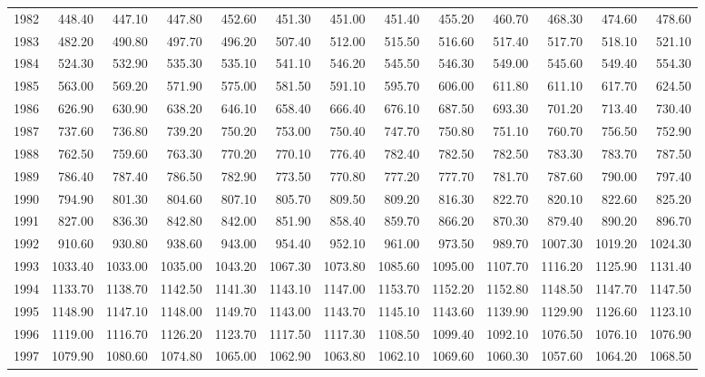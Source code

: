 \begin{longtable}{rrrrrrrrrrrrr}
  1982 & 448.40 & 447.10 & 447.80 & 452.60 & 451.30 & 451.00 & 451.40 & 455.20 & 460.70 & 468.30 & 474.60 & 478.60 \\ 
  1983 & 482.20 & 490.80 & 497.70 & 496.20 & 507.40 & 512.00 & 515.50 & 516.60 & 517.40 & 517.70 & 518.10 & 521.10 \\ 
  1984 & 524.30 & 532.90 & 535.30 & 535.10 & 541.10 & 546.20 & 545.50 & 546.30 & 549.00 & 545.60 & 549.40 & 554.30 \\ 
  1985 & 563.00 & 569.20 & 571.90 & 575.00 & 581.50 & 591.10 & 595.70 & 606.00 & 611.80 & 611.10 & 617.70 & 624.50 \\ 
  1986 & 626.90 & 630.90 & 638.20 & 646.10 & 658.40 & 666.40 & 676.10 & 687.50 & 693.30 & 701.20 & 713.40 & 730.40 \\ 
  1987 & 737.60 & 736.80 & 739.20 & 750.20 & 753.00 & 750.40 & 747.70 & 750.80 & 751.10 & 760.70 & 756.50 & 752.90 \\ 
  1988 & 762.50 & 759.60 & 763.30 & 770.20 & 770.10 & 776.40 & 782.40 & 782.50 & 782.50 & 783.30 & 783.70 & 787.50 \\ 
  1989 & 786.40 & 787.40 & 786.50 & 782.90 & 773.50 & 770.80 & 777.20 & 777.70 & 781.70 & 787.60 & 790.00 & 797.40 \\ 
  1990 & 794.90 & 801.30 & 804.60 & 807.10 & 805.70 & 809.50 & 809.20 & 816.30 & 822.70 & 820.10 & 822.60 & 825.20 \\ 
  1991 & 827.00 & 836.30 & 842.80 & 842.00 & 851.90 & 858.40 & 859.70 & 866.20 & 870.30 & 879.40 & 890.20 & 896.70 \\ 
  1992 & 910.60 & 930.80 & 938.60 & 943.00 & 954.40 & 952.10 & 961.00 & 973.50 & 989.70 & 1007.30 & 1019.20 & 1024.30 \\ 
  1993 & 1033.40 & 1033.00 & 1035.00 & 1043.20 & 1067.30 & 1073.80 & 1085.60 & 1095.00 & 1107.70 & 1116.20 & 1125.90 & 1131.40 \\ 
  1994 & 1133.70 & 1138.70 & 1142.50 & 1141.30 & 1143.10 & 1147.00 & 1153.70 & 1152.20 & 1152.80 & 1148.50 & 1147.70 & 1147.50 \\ 
  1995 & 1148.90 & 1147.10 & 1148.00 & 1149.70 & 1143.00 & 1143.70 & 1145.10 & 1143.60 & 1139.90 & 1129.90 & 1126.60 & 1123.10 \\ 
  1996 & 1119.00 & 1116.70 & 1126.20 & 1123.70 & 1117.50 & 1117.30 & 1108.50 & 1099.40 & 1092.10 & 1076.50 & 1076.10 & 1076.90 \\ 
  1997 & 1079.90 & 1080.60 & 1074.80 & 1065.00 & 1062.90 & 1063.80 & 1062.10 & 1069.60 & 1060.30 & 1057.60 & 1064.20 & 1068.50 \\ 

\end{longtable}
